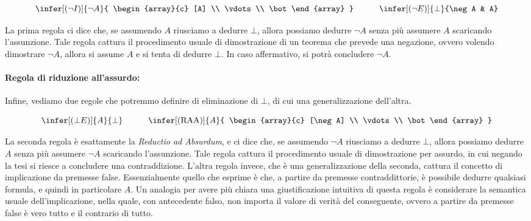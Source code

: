 \begin{equation*}
  \infer[(\neg I)]{\neg A}{
    \begin{array}{c}
    [A] \\
    \vdots \\
    \bot
  \end{array}
  } \quad\quad\quad
  \infer[(\neg E)]{\bot}{\neg A & A}
\end{equation*}

La prima regola ci dice che, se assumendo \(A\) riusciamo a dedurre \(\bot\), allora possiamo dedurre \(\neg A\) senza più assumere \(A\) scaricando l'assunzione. Tale regola cattura il procedimento usuale di dimostrazione di un teorema che prevede una negazione, ovvero volendo dimostrare \(\neg A\), allora si assume \(A\) e si tenta di dedurre \(\bot\). In caso affermativo, si potrà concludere \(\neg A\).

\paragraph{Regola di riduzione all'assurdo:}

Infine, vediamo due regole che potremmo definire di eliminazione di \(\bot\), di cui una generalizzazione dell'altra.

\begin{equation*}
  \infer[(\bot E)]{A}{\bot} \quad\quad\quad
  \infer[(\RAA)]{A}{
    \begin{array}{c}
    [\neg A] \\
    \vdots \\
    \bot
  \end{array}
  }
\end{equation*}

La seconda regola è esattamente la \textit{Reductio ad Absurdum}, e ci dice che, se assumendo \(\neg A\) riusciamo a dedurre \(\bot\), allora possiamo dedurre \(A\) senza più assumere \(\neg A\) scaricando l'assunzione. Tale regola cattura il procedimento usuale di dimostrazione per assurdo, in cui negando la tesi si riesce a concludere una contraddizione. L'altra regola invece, che è una generalizzazione della seconda, cattura il concetto di implicazione da premesse false.
Essenzialmente quello che esprime è che, a partire da premesse contraddittorie, è possibile dedurre qualsiasi formula, e quindi in particolare \(A\). Un analogia per avere più chiara una giustificazione intuitiva di questa regola è considerare la semantica usuale dell'implicazione, nella quale, con antecedente falso, non importa il valore di verità del conseguente, ovvero a partire da premesse false è vero tutto e il contrario di tutto.

